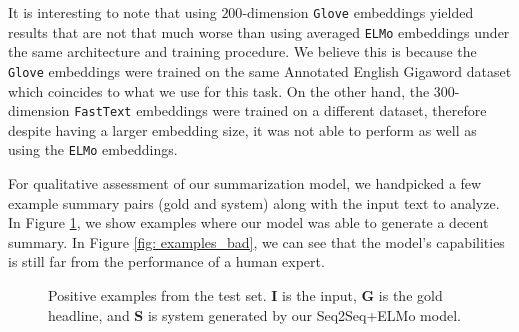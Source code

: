 It is interesting to note that using $200$-dimension \texttt{Glove} embeddings yielded results that are not that much worse than using averaged \texttt{ELMo} embeddings under the same architecture and training procedure. We believe this is because the \texttt{Glove} embeddings were trained on the same Annotated English Gigaword dataset which coincides to what we use for this task. On the other hand, the $300$-dimension \texttt{FastText} embeddings were trained on a different dataset, therefore despite having a larger embedding size, it was not able to perform as well as using the \texttt{ELMo} embeddings.

For qualitative assessment of our summarization model, we handpicked a few example summary pairs (gold and system) along with the input text to analyze. In Figure \ref{fig: examples_good}, we show examples where our model was able to generate a decent summary.  In Figure \ref{fig: examples_bad}, we can see that the model's capabilities is still far from the performance of a human expert. 


\begin{figure}[ht]
\caption{Positive examples from the test set. \textbf{I} is the input, \textbf{G} is the gold headline, and \textbf{S} is system generated by our Seq2Seq+ELMo model.}
\label{fig: examples_good}
\noindent{}
\end{figure}


